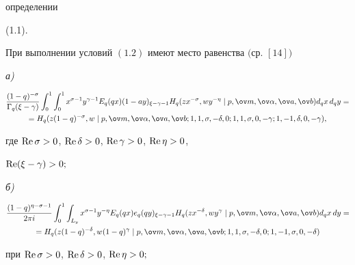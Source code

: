 определении 


(1.1). 


 


\begin{thms} 


При выполнении условий $(1.2)$ имеют место равенства $($ср. $[14])$ 


 


{\em а)} 


\begin{multline*} 


\frac{(1-q)^{-\sigma}}{\Gamma_q(\xi-\gamma)}\int^1_0\int^1_0 


x^{\sigma-1}y^{\gamma-1}E_q(q x)(1-a y)_{\xi-\gamma-1}H_q 


(z x^{-\sigma},w y^{-\eta}\mid 


p,\ov m,\ov\alpha,\ov a,\ov b)d_q x\,d_q y= \\ 


% 


=H_q(z(1-q)^{-\sigma},w\mid p,\ov m,\ov\alpha,\ov a,\ov b; 


1,1,\sigma,-\delta,0;1,1,\sigma,0,-\gamma;1,-1,\delta,0,-\gamma), 


\end{multline*} 


где $\operatorname{Re}\sigma>0$, $\operatorname{Re}\delta>0$, $\operatorname{Re}\gamma>0$, $\operatorname{Re}\eta>0$, 


$\operatorname{Re}(\xi-\gamma)>0;$ 


 


{\em б)} 


\begin{multline*} 


\frac{(1-q)^{\eta-\sigma-1}}{2\pi i}\int^1_0\int_{L_y} 


x^{\sigma-1}y^{-\eta}E_q(q x)e_q(q y)_{\xi-\gamma-1}H_q 


(z x^{-\delta},w y^\gamma\mid p,\ov m,\ov\alpha,\ov a,\ov b) 


d_q x\,dy= \\ 


% 


=H_q(z(1-q)^{-\delta},w(1-q)^\gamma\mid 


p,\ov m,\ov\alpha,\ov a,\ov b; 1,1,\sigma,-\delta,0;1,-1, 


\sigma,0,-\delta) 


\end{multline*} 


при $\operatorname{Re}\sigma>0$, $\operatorname{Re}\delta>0$, $\operatorname{Re}\eta>0;$ 



\end{thms}

